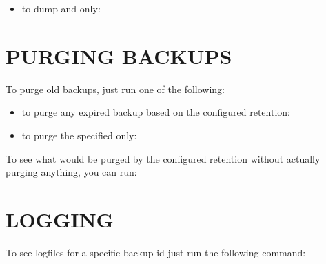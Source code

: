 \documentclass[letterpaper,10pt,english]{sphinxmanual}
\begin{document}
\sphinxAtStartPar
{}
\begin{itemize}
\item {} 
\sphinxAtStartPar
to dump  and  only:

\end{itemize}

\sphinxAtStartPar
{}


\section{PURGING BACKUPS}
\label{\detokenize{mariadb-backup-manager:purging-backups}}
\sphinxAtStartPar
To purge old backups, just run one of the following:
\begin{itemize}
\item {} 
\sphinxAtStartPar
to purge any expired backup based on the configured retention:

\end{itemize}

\sphinxAtStartPar
{}
\begin{itemize}
\item {} 
\sphinxAtStartPar
to purge the specified  only:

\end{itemize}

\sphinxAtStartPar
{}

\sphinxAtStartPar
To see what would be purged by the configured retention without actually purging
anything, you can run:

\sphinxAtStartPar
{}


\section{LOGGING}
\label{\detokenize{mariadb-backup-manager:logging}}
\sphinxAtStartPar
To see logfiles for a specific backup id just run the following command:
\end{document}
